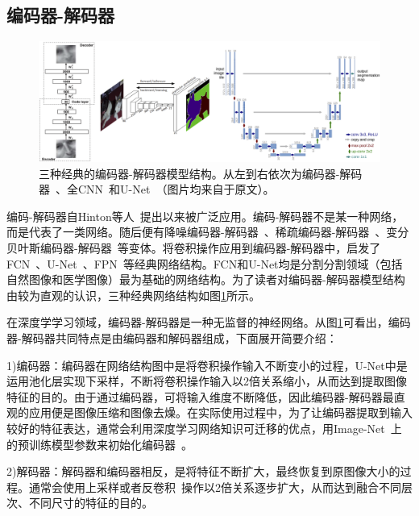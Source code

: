 \subsection{编码器-解码器}
\begin{figure}[h]
	\centering
	\includegraphics[width=1.0\textwidth]{figure/popular_encoder_decoder}
	\caption{三种经典的编码器-解码器模型结构。从左到右依次为编码器-解码器~\cite{hinton2006reducing}、全CNN~\cite{long2015fully}和U-Net~\cite{ronneberger2015u}（图片均来自于原文）。} 
	\label{fig:popular_encoder_decoder}
\end{figure}
编码-解码器自Hinton等人~\cite{hinton2006reducing}提出以来被广泛应用。编码-解码器不是某一种网络，而是代表了一类网络。随后便有降噪编码器-解码器~\cite{vincent2008extracting}、稀疏编码器-解码器~\cite{coates2011analysis}、变分贝叶斯编码器-解码器~\cite{kingma2013auto}等变体。将卷积操作应用到编码器-解码器中，启发了FCN~\cite{long2015fully}、U-Net~\cite{ronneberger2015u}、FPN~\cite{lin2017feature}等经典网络结构。FCN和U-Net均是分割分割领域（包括自然图像和医学图像）最为基础的网络结构。为了读者对编码器-解码器模型结构由较为直观的认识，三种经典网络结构如图\ref{fig:popular_encoder_decoder}所示。

在深度学学习领域，编码器-解码器是一种无监督的神经网络。从图\ref{fig:popular_encoder_decoder}可看出，编码器-解码器共同特点是由编码器和解码器组成，下面展开简要介绍：

1)编码器：编码器在网络结构图中是将卷积操作输入不断变小的过程，U-Net中是运用池化层实现下采样，不断将卷积操作输入以2倍关系缩小，从而达到提取图像特征的目的。由于通过编码器，可将输入维度不断降低，因此编码器-解码器最直观的应用便是图像压缩和图像去燥。在实际使用过程中，为了让编码器提取到输入较好的特征表达，通常会利用深度学习网络知识可迁移的优点，用Image-Net~\cite{deng2009imagenet}上的预训练模型参数来初始化编码器~\cite{iglovikov2018ternausnet}。

2)解码器：解码器和编码器相反，是将特征不断扩大，最终恢复到原图像大小的过程。通常会使用上采样或者反卷积~\cite{zeiler2010deconvolutional}操作以2倍关系逐步扩大，从而达到融合不同层次、不同尺寸的特征的目的。

